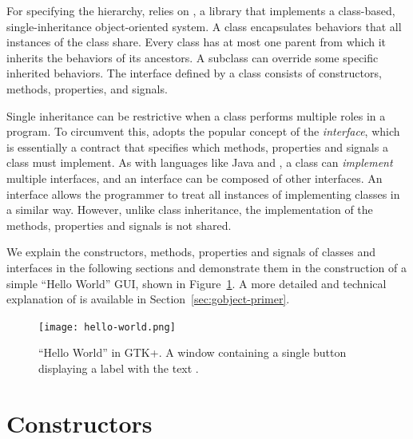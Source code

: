 For specifying the hierarchy,  relies on , a
 library that implements a class-based, single-inheritance
object-oriented system. A  class encapsulates behaviors
that all instances of the class share. Every class has at most one
parent from which it inherits the behaviors of its ancestors. A
subclass can override some specific inherited behaviors. The interface
defined by a class consists of constructors, methods, properties,
and signals. 

Single inheritance can be restrictive when a class performs multiple
roles in a program. To circumvent this,  adopts the popular
concept of the \textit{interface}, which is essentially a contract
that specifies which methods, properties and signals a class must
implement. As with languages like Java and , a class can
\textit{implement} multiple interfaces, and an interface can be
composed of other interfaces. An interface allows the programmer to
treat all instances of implementing classes in a similar way. However,
unlike class inheritance, the implementation of the methods,
properties and signals is not shared.

We explain the constructors, methods, properties and signals of
classes and interfaces in the following sections and demonstrate them
in the construction of a simple ``Hello World'' GUI, shown in
Figure~\ref{fig:hello-world}. A more detailed and technical
explanation of  is available in
Section~\ref{sec:gobject-primer}.

\begin{figure}[h!tbp]
  \begin{center}
    \texttt{[image: hello-world.png]}
    \caption{\label{fig:hello-world}``Hello World'' in GTK+. 
      A window containing a single button displaying a label with the text
      .}
  \end{center}
\end{figure}

\section{Constructors}

